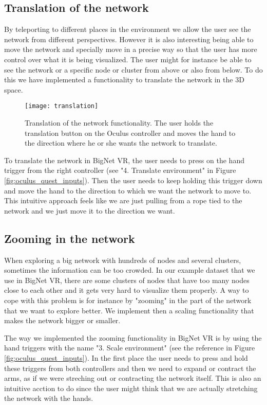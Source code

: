 \subsection{Translation of the network}
By teleporting to different places in the environment we allow the user see the network from different perspectives. However it is also interesting being able to move the network and specially move in a precise way so that the user has more control over what it is being visualized. The user might for instance be able to see the network or a specific node or cluster from above or also from below. To do this we have implemented a functionality to translate the network in the 3D space.

\begin{figure}[h!]
    \centering%
    \texttt{[image: translation]}
    \caption{Translation of the network functionality. The user holds the translation button on the Oculus controller and moves the hand to the direction where he or she wants the network to translate.}
    \label{fig:translation}
\end{figure}%

To translate the network in BigNet VR, the user needs to press on the hand trigger from the right controller (see "4. Translate environment" in Figure \ref{fig:oculus_quest_inputs}). Then the user needs to keep holding this trigger down and move the hand to the direction to which we want the network to move to. This intuitive approach feels like we are just pulling from a rope tied to the network and we just move it to the direction we want.


\subsection{Zooming in the network}
When exploring a big network with hundreds of nodes and several clusters, sometimes the information can be too crowded. In our example dataset that we use in BigNet VR, there are some clusters of nodes that have too many nodes close to each other and it gets very hard to visualize them properly. A way to cope with this problem is for instance by "zooming" in the part of the network that we want to explore better. We implement then a scaling functionality that makes the network bigger or smaller.

The way we implemented the zooming functionality in BigNet VR is by using the hand triggers with the name "3. Scale environment" (see the reference in Figure \ref{fig:oculus_quest_inputs}). In the first place the user needs to press and hold these triggers from both controllers and then we need to expand or contract the arms, as if we were streching out or contracting the network itself. This is also an intuitive acction to do since the user might think that we are actually stretching the network with the hands.

